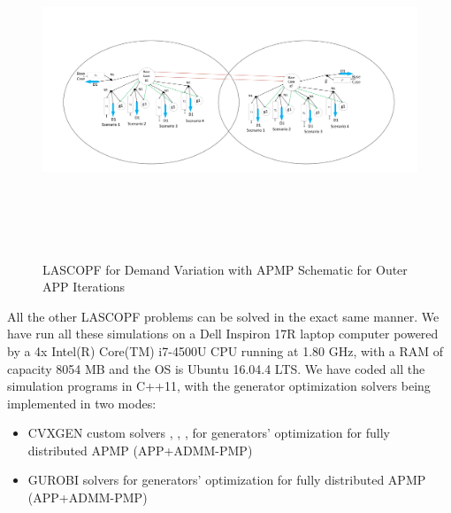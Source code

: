 \documentclass[preprint,12pt,3p]{elsarticle}
\begin{document}
	\begin{figure}
		\begin{center}
			\vspace*{-2cm}
			\includegraphics[height=10cm,width=17cm]{LASCOPF_Prox_Fig.pdf}
			\caption{LASCOPF for Demand Variation with APMP Schematic for Outer APP Iterations}
			\label{LASCOPFDV_APMP}
		\end{center}
	\end{figure}
	All the other LASCOPF problems can be solved in the exact same manner. We have run all these simulations on a Dell Inspiron 17R laptop computer powered by a 4x Intel(R) Core(TM) i7-4500U CPU running at 1.80 GHz, with a RAM of capacity 8054 MB and the OS is Ubuntu 16.04.4 LTS. We have coded all the simulation programs in C++11, with the generator optimization solvers being implemented in two modes: 
	\begin{itemize}
		\item CVXGEN custom solvers \cite{cvxgen01}, \cite{cvxgen02}, \cite{cvxgen03}, \cite{cvxgen04} for generators' optimization for fully distributed APMP (APP+ADMM-PMP)
		\item GUROBI solvers for generators' optimization for fully distributed APMP (APP+ADMM-PMP)
	\end{itemize} 
\end{document}
